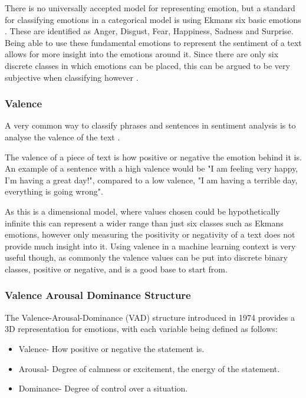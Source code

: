 There is no universally accepted model for representing emotion, but a standard for classifying emotions in a categorical model is using Ekmans six basic emotions \cite{Ekman}. These are identified as Anger, Disgust, Fear, Happiness, Sadness and Surprise. Being able to use these fundamental emotions to represent the sentiment of a text allows for more insight into the emotions around it. Since there are only six discrete classes in which emotions can be placed, this can be argued to be very subjective when classifying however \cite{emoBank}.

\subsubsection{Valence}
A very common way to classify phrases and sentences in sentiment analysis is to analyse the valence of the text \cite{frijda1986emotions}.

The valence of a piece of text is how positive or negative the emotion behind it is. An example of a sentence with a high valence would be "I am feeling very happy, I'm having a great day!", compared to a low valence, "I am having a terrible day, everything is going wrong". 

As this is a dimensional model, where values chosen could be hypothetically infinite this can represent a wider range than just six classes such as Ekmans emotions, however only measuring the positivity or negativity of a text does not provide much insight into it.
Using valence in a machine learning context is very useful though, as commonly the valence values can be put into discrete binary classes, positive or negative, and is a good base to start from.

\subsubsection{Valence Arousal Dominance Structure}

The Valence-Arousal-Dominance (VAD) structure introduced in 1974 \cite{VAD} provides a 3D representation for emotions, with each variable being defined as follows:
\begin{itemize}
    \item Valence- How positive or negative the statement is.
    \item Arousal- Degree of calmness or excitement, the energy of the statement. 
    \item Dominance- Degree of control over a situation.
\end{itemize}

